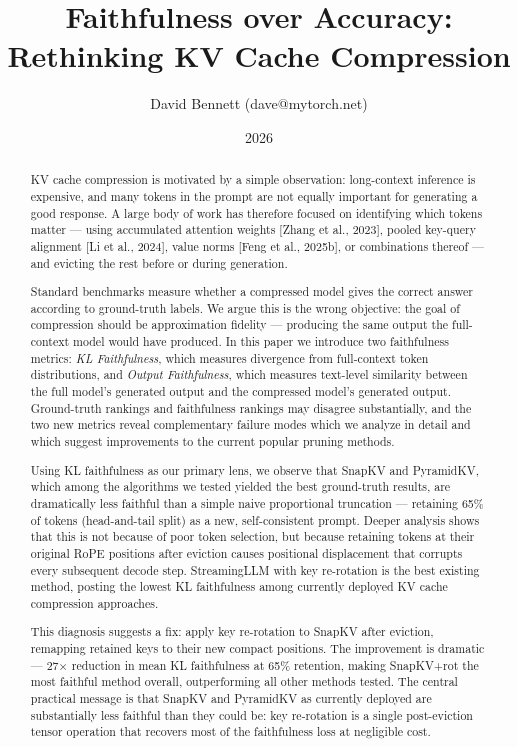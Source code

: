 \documentclass[10pt,letterpaper]{article}
\title{Faithfulness over Accuracy:\\Rethinking KV Cache Compression}
\author{David Bennett (dave@mytorch.net)}
\date{2026}
\begin{document}
\maketitle

\begin{abstract}
\normalsize
KV cache compression is motivated by a simple observation: long-context
inference is expensive, and many tokens in the prompt are not equally
important for generating a good response. A large body of work has
therefore focused on identifying which tokens matter --- using
accumulated attention weights {[}Zhang et al., 2023{]}, pooled key-query
alignment {[}Li et al., 2024{]}, value norms {[}Feng et al., 2025b{]},
or combinations thereof --- and evicting the rest before or during
generation.

Standard benchmarks measure whether a compressed model gives the correct
answer according to ground-truth labels. We argue this is the wrong
objective: the goal of compression should be approximation fidelity ---
producing the same output the full-context model would have produced. In
this paper we introduce two faithfulness metrics: \emph{KL
Faithfulness}, which measures divergence from full-context token
distributions, and \emph{Output Faithfulness}, which measures text-level
similarity between the full model's generated output and the compressed
model's generated output. Ground-truth rankings and faithfulness
rankings may disagree substantially, and the two new metrics reveal
complementary failure modes which we analyze in detail and which suggest
improvements to the current popular pruning methods.

Using KL faithfulness as our primary lens, we observe that SnapKV and
PyramidKV, which among the algorithms we tested yielded the best
ground-truth results, are dramatically less faithful than a simple naive
proportional truncation --- retaining 65\% of tokens (head-and-tail
split) as a new, self-consistent prompt. Deeper analysis shows that this
is not because of poor token selection, but because retaining tokens at
their original RoPE positions after eviction causes positional
displacement that corrupts every subsequent decode step. StreamingLLM
with key re-rotation is the best existing method, posting the lowest KL
faithfulness among currently deployed KV cache compression approaches.

This diagnosis suggests a fix: apply key re-rotation to SnapKV after
eviction, remapping retained keys to their new compact positions. The
improvement is dramatic --- 27× reduction in mean KL faithfulness at
65\% retention, making SnapKV+rot the most faithful method overall,
outperforming all other methods tested. The central practical message is
that SnapKV and PyramidKV as currently deployed are substantially less
faithful than they could be: key re-rotation is a single post-eviction
tensor operation that recovers most of the faithfulness loss at
negligible cost.
\end{abstract}
\end{document}
